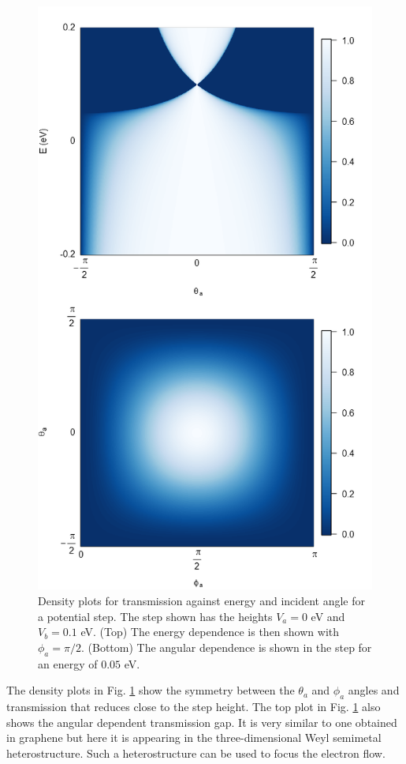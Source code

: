 \documentclass[prb,twocolumn,aps,superscriptaddress,showpacs,floatfix]{revtex4}
\begin{document}
\begin{figure}
	\centerline{\includegraphics[scale=0.4]{weyl-t-step}}
	\caption{Density plots for transmission against energy and incident angle for a potential step. The step shown has the heights $V_{a}=0$ eV and $V_{b}=0.1$ eV. (Top) The energy dependence is then shown with $\phi_{a}=\pi/2$. (Bottom) The angular dependence is shown in the step for an energy of $0.05$ eV.}
	\label{weyl-t-step}
\end{figure}

	The density plots in Fig. \ref{weyl-t-step} show the symmetry between the $\theta_{a}$ and $\phi_{a}$ angles and transmission that reduces close to the step height. The top plot in Fig. \ref{weyl-t-step} also shows the angular dependent transmission gap. It is very similar to one obtained in graphene \cite{b16} but here it is appearing in the three-dimensional Weyl semimetal heterostructure. Such a heterostructure can be used to focus the electron flow.
\end{document}
